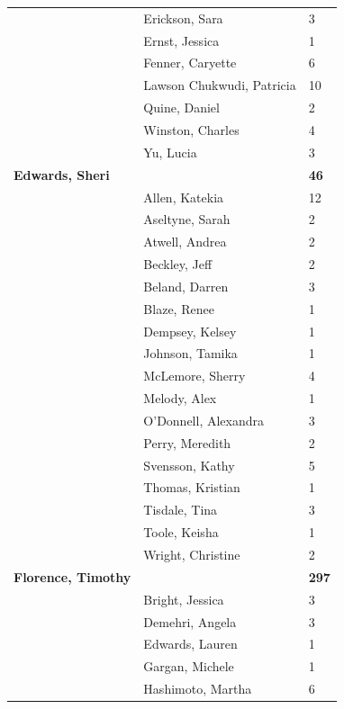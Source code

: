 \documentclass{article}\usepackage[]{graphicx}\usepackage[]{color}
\begin{document}
{\begin{longtable} { >{\raggedright}p{}|p{}p{}}
   \rowcolor[gray]{0.90} & Erickson, Sara & 3 \\ 
   \rowcolor[gray]{0.90} & Ernst, Jessica & 1 \\ 
   \rowcolor[gray]{0.90} & Fenner, Caryette & 6 \\ 
   & Lawson Chukwudi, Patricia & 10 \\ 
   & Quine, Daniel & 2 \\ 
   & Winston, Charles & 4 \\ 
   \rowcolor[gray]{0.90} & Yu, Lucia & 3 \\ 
   \rowcolor[gray]{0.90}\textbf{Edwards, Sheri} &  & \hspace{2cm}\textbf{46} \\ 
   \rowcolor[gray]{0.90} & Allen, Katekia & 12 \\ 
   & Aseltyne, Sarah & 2 \\ 
   & Atwell, Andrea & 2 \\ 
   & Beckley, Jeff & 2 \\ 
   \rowcolor[gray]{0.90} & Beland, Darren & 3 \\ 
   \rowcolor[gray]{0.90} & Blaze, Renee & 1 \\ 
   \rowcolor[gray]{0.90} & Dempsey, Kelsey & 1 \\ 
   & Johnson, Tamika & 1 \\ 
   & McLemore, Sherry & 4 \\ 
   & Melody, Alex & 1 \\ 
   \rowcolor[gray]{0.90} & O'Donnell, Alexandra & 3 \\ 
   \rowcolor[gray]{0.90} & Perry, Meredith & 2 \\ 
   \rowcolor[gray]{0.90} & Svensson, Kathy & 5 \\ 
   & Thomas, Kristian & 1 \\ 
   & Tisdale, Tina & 3 \\ 
   & Toole, Keisha & 1 \\ 
   \rowcolor[gray]{0.90} & Wright, Christine & 2 \\ 
   \rowcolor[gray]{0.90}\textbf{Florence, Timothy} &  & \hspace{2cm}\textbf{297} \\ 
   \rowcolor[gray]{0.90} & Bright, Jessica & 3 \\ 
   & Demehri, Angela & 3 \\ 
   & Edwards, Lauren & 1 \\ 
   & Gargan, Michele & 1 \\ 
   \rowcolor[gray]{0.90} & Hashimoto, Martha & 6 \\ 

\end{longtable}}
\end{document}
